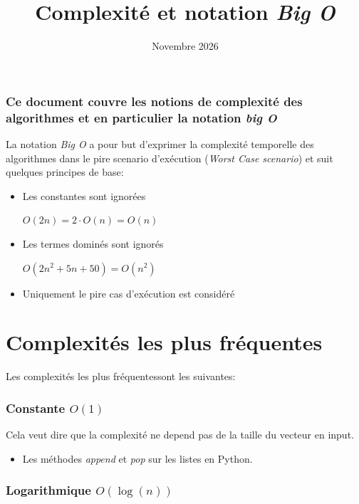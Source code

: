 \documentclass{article}
\title{Complexité et notation \emph{Big O}}
\date{Novembre 2026}
\begin{document}
\maketitle

\subsubsection*{Ce document couvre les notions de complexité des algorithmes et en particulier la notation \emph{big O}}

La notation \emph{Big O} a pour but d'exprimer la complexité temporelle des algorithmes dans le pire scenario d'exécution (\textit{Worst Case scenario}) et suit quelques principes de base:

\begin{itemize}
    \item Les constantes sont ignorées
    
    $O(2n) = 2 \cdot O(n) = O(n)$
    
    \item Les termes dominés sont ignorés
    
    $O(2n^2 + 5n + 50) = O(n^2)$
    
    
    \item Uniquement le pire cas d'exécution est considéré
\end{itemize}

\section*{Complexités les plus fréquentes}

Les complexités les plus fréquentessont les suivantes:

\subsubsection*{Constante $O(1)$}

Cela veut dire que la complexité ne depend pas de la taille du vecteur en input.
\begin{itemize}
    \item Les méthodes \emph{append} et \emph{pop} sur les listes en Python.
\end{itemize}

\subsubsection*{Logarithmique $O(\log(n))$}
\end{document}
